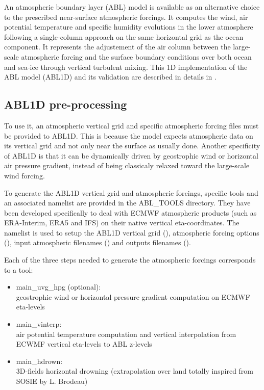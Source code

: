 \documentclass[../main/NEMO_manual]{subfiles}
\begin{document}
An atmospheric boundary layer (ABL) model is available as an alternative choice to the prescribed near-surface atmospheric forcings.
It computes the wind, air potential temperature and specific humidity evolutions in the lower atmosphere following a single-column approach
on the same horizontal grid as the ocean component. It represents the adjustement of the air column between the large-scale
atmospheric forcing and the surface boundary conditions over both ocean and sea-ice through vertical turbulent mixing.
This 1D implementation of the ABL model (ABL1D) and its validation are described in details in \citet{lemarie.samson.ea_GMD21}.

\subsection{ABL1D pre-processing}

To use it, an atmospheric vertical grid and specific atmospheric forcing files must be provided to ABL1D.
This is because the model expects atmospheric data on its vertical grid and not only near the surface as usually done.
Another specificity of ABL1D is that it can be dynamically driven by geostrophic wind or horizontal air pressure gradient,
instead of being classicaly relaxed toward the large-scale wind forcing.

To generate the ABL1D vertical grid and atmospheric forcings, specific tools and an associated namelist are provided in the ABL\_TOOLS directory.
They have been developed specifically to deal with ECMWF atmospheric products (such as ERA-Interim, ERA5 and IFS) on their native vertical eta-coordinates.
The namelist is used to setup the ABL1D vertical grid (), atmospheric forcing options (),
input atmospheric filenames () and outputs filenames ().

\begin{listing}
  \label{lst:namelist_abl_tools}
\end{listing}

Each of the three steps needed to generate the atmospheric forcings corresponds to a tool:

\begin{itemize}
\item main\_uvg\_hpg (optional):\\
  geostrophic wind or horizontal pressure gradient computation on ECMWF eta-levels
\item main\_vinterp:\\
  air potential temperature computation and vertical interpolation from ECWMF vertical eta-levels to ABL z-levels
\item main\_hdrown:\\
  3D-fields horizontal drowning (extrapolation over land totally inspired from SOSIE by L. Brodeau)
\end{itemize}
\end{document}
